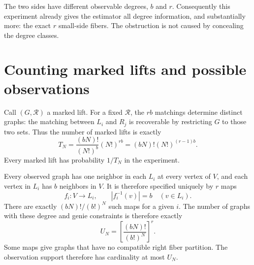 \documentclass[11pt]{article}
\begin{document}
The two sides have different observable degrees, $b$ and $r$.
Consequently this experiment already gives the estimator all degree
information, and substantially more: the exact $r$ small-side
fibers. The obstruction is not caused by concealing the degree classes.

\section{Counting marked lifts and possible observations}
Call $(G,\mathcal R)$ a marked lift. For a fixed $\mathcal R$, the
$rb$ matchings determine distinct graphs: the matching between
$L_i$ and $R_j$ is recoverable by restricting $G$ to those two sets.
Thus the number of marked lifts is exactly
\begin{equation}\label{eq:T}
 T_N=\frac{(bN)!}{(N!)^b}(N!)^{rb}
     =(bN)!(N!)^{(r-1)b}.
\end{equation}
Every marked lift has probability $1/T_N$ in the experiment.

Every observed graph has one neighbor in each $L_i$ at every
vertex of $V$, and each vertex in $L_i$ has $b$ neighbors in $V$.
It is therefore specified uniquely by $r$ maps
\[
 f_i:V\longrightarrow L_i,\qquad |f_i^{-1}(v)|=b
       \quad(v\in L_i).
\]
There are exactly $(bN)!/(b!)^N$ such maps for a given $i$.
The number of graphs with these degree and genie constraints is
therefore exactly
\begin{equation}\label{eq:U}
 U_N=\left[\frac{(bN)!}{(b!)^N}\right]^r.
\end{equation}
Some maps give graphs that have no compatible right fiber partition.
The observation support therefore has cardinality at most $U_N$.
\end{document}

